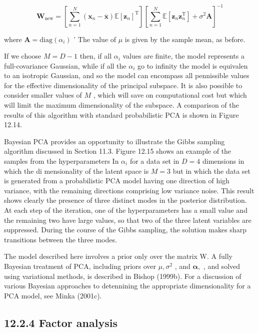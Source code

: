 \documentclass[
  10
]{article}
\begin{document}
\[
\mathbf {W} _ {\mathrm{new}} = \left[ \sum_ {n = 1} ^ {N} (\mathbf {x} _ {n} - \overline {{\mathbf {x}}}) \mathbb {E} [ \mathbf {z} _ {n} ] ^ {\mathrm{T}} \right] \left[ \sum_ {n = 1} ^ {N} \mathbb {E} [ \mathbf {z} _ {n} \mathbf {z} _ {n} ^ {\mathrm{T}} ] + \sigma^ {2} \mathbf {A} \right] ^ {- 1}\tag{12.63}
\]

where \(\mathbf { A } = \mathrm { d i a g } ( \alpha _ { i } )\) ' The
value of \(\mu\) is given by the sample mean, as before.

If we choose \(M = D - 1\) then, if all \(\alpha _ { i }\) values are
finite, the model represents a full-covariance Gaussian, while if all
the \(\alpha _ { i }\) go to infinity the model is equivalen to an
isotropic Gaussian, and so the model can encompass all pennissible
values for the effective dimensionality of the principal subspace. It is
also possible to consider smaller values of \(M\) , which will save on
computational cost but which will limit the maximum dimensionality of
the subspace. A comparison of the results of this algorithm with
standard probabilistic PCA is shown in Figure 12.14.

Bayesian PCA provides an opportunity to illustrate the Gibbs sampling
algorithm discussed in Section 11.3. Figure 12.15 shows an example of
the samples from the hyperparameters In \(\alpha _ { i }\) for a data
set in \(D = 4\) dimensions in which the di mensionality of the latent
space is \(M = 3\) but in which the data set is generated from a
probabilistic PCA model having one direction of high variance, with the
remaining directions comprising low variance noise. This result shows
clearly the presence of three distinct modes in the posterior
distribution. At each step of the iteration, one of the hyperparameters
has a small value and the remaining two have large values, so that two
of the three latent variables are suppressed. During the course of the
Gibbs sampling, the solution makes sharp transitions between the three
modes.

The model described here involves a prior only over the matrix W. A
fully Bayesian treatment of PCA, including priors over
\(\mu , \sigma ^ { 2 }\) , and \(\pmb { \alpha } ,\) , and solved using
variational methods, is described in Bishop (1999b). For a discussion of
various Bayesian approaches to detennining the appropriate
dimensionality for a PCA model, see Minka (2001c).

\subsection{12.2.4 Factor analysis}\label{factor-analysis}
\end{document}
